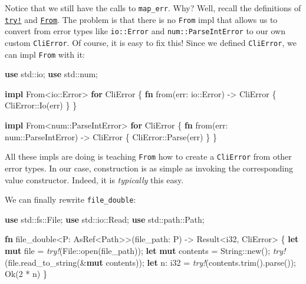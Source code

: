 \documentclass[a4paper,]{book}
\newenvironment{Shaded}{\begin{snugshade}}{\end{snugshade}}
\newcommand{\KeywordTok}[1]{\textcolor[rgb]{0.13,0.29,0.53}{\textbf{{#1}}}}
\newcommand{\DataTypeTok}[1]{\textcolor[rgb]{0.13,0.29,0.53}{{#1}}}
\newcommand{\DecValTok}[1]{\textcolor[rgb]{0.00,0.00,0.81}{{#1}}}
\newcommand{\ConstantTok}[1]{\textcolor[rgb]{0.00,0.00,0.00}{{#1}}}
\newcommand{\PreprocessorTok}[1]{\textcolor[rgb]{0.56,0.35,0.01}{\textit{{#1}}}}
\newcommand{\NormalTok}[1]{{#1}}
\begin{document}
Notice that we still have the calls to \texttt{map\_err}. Why? Well,
recall the definitions of
\protect\hyperlink{code-try-def}{\texttt{try!}} and
\protect\hyperlink{code-from-def}{\texttt{From}}. The problem is that
there is no \texttt{From} impl that allows us to convert from error
types like \texttt{io::Error} and \texttt{num::ParseIntError} to our own
custom \texttt{CliError}. Of course, it is easy to fix this! Since we
defined \texttt{CliError}, we can impl \texttt{From} with it:

\begin{Shaded}
\begin{Highlighting}[]
\KeywordTok{use} \NormalTok{std::io;}
\KeywordTok{use} \NormalTok{std::num;}

\KeywordTok{impl} \NormalTok{From<io::Error> }\KeywordTok{for} \NormalTok{CliError \{}
    \KeywordTok{fn} \NormalTok{from(err: io::Error) -> CliError \{}
        \NormalTok{CliError::Io(err)}
    \NormalTok{\}}
\NormalTok{\}}

\KeywordTok{impl} \NormalTok{From<num::ParseIntError> }\KeywordTok{for} \NormalTok{CliError \{}
    \KeywordTok{fn} \NormalTok{from(err: num::ParseIntError) -> CliError \{}
        \NormalTok{CliError::Parse(err)}
    \NormalTok{\}}
\NormalTok{\}}
\end{Highlighting}
\end{Shaded}

All these impls are doing is teaching \texttt{From} how to create a
\texttt{CliError} from other error types. In our case, construction is
as simple as invoking the corresponding value constructor. Indeed, it is
\emph{typically} this easy.

We can finally rewrite \texttt{file\_double}:

\begin{Shaded}
\begin{Highlighting}[]

\KeywordTok{use} \NormalTok{std::fs::File;}
\KeywordTok{use} \NormalTok{std::io::Read;}
\KeywordTok{use} \NormalTok{std::path::Path;}

\KeywordTok{fn} \NormalTok{file_double<P: AsRef<Path>>(file_path: P) -> }\DataTypeTok{Result}\NormalTok{<}\DataTypeTok{i32}\NormalTok{, CliError> \{}
    \KeywordTok{let} \KeywordTok{mut} \NormalTok{file = }\PreprocessorTok{try!}\NormalTok{(File::open(file_path));}
    \KeywordTok{let} \KeywordTok{mut} \NormalTok{contents = }\DataTypeTok{String}\NormalTok{::new();}
    \PreprocessorTok{try!}\NormalTok{(file.read_to_string(&}\KeywordTok{mut} \NormalTok{contents));}
    \KeywordTok{let} \NormalTok{n: }\DataTypeTok{i32} \NormalTok{= }\PreprocessorTok{try!}\NormalTok{(contents.trim().parse());}
    \ConstantTok{Ok}\NormalTok{(}\DecValTok{2} \NormalTok{* n)}
\NormalTok{\}}
\end{Highlighting}
\end{Shaded}
\end{document}
